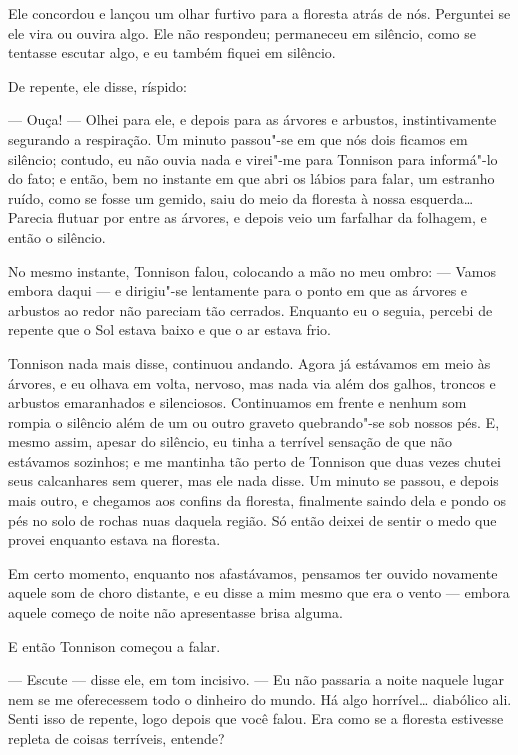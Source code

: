 Ele concordou e lançou um olhar furtivo para a floresta atrás de nós. Perguntei se ele vira ou ouvira algo. Ele não
respondeu; permaneceu em silêncio, como se tentasse escutar algo, e eu também fiquei em silêncio.

De repente, ele disse, ríspido:

--- Ouça! --- Olhei para ele, e depois para as árvores e arbustos, instintivamente segurando a respiração. Um minuto passou"-se
em que nós dois ficamos em silêncio; contudo, eu não ouvia nada e virei"-me para Tonnison para informá"-lo do fato; e
então, bem no instante em que abri os lábios para falar, um estranho ruído, como se fosse um gemido, saiu do meio da
floresta à nossa esquerda\ldots{} Parecia flutuar por entre as árvores, e depois veio um farfalhar da folhagem, e então o
silêncio.

No mesmo instante, Tonnison falou, colocando a mão no meu ombro: --- Vamos embora daqui --- e dirigiu"-se lentamente para o
ponto em que as árvores e arbustos ao redor não pareciam tão cerrados. Enquanto eu o seguia, percebi de repente que o
Sol estava baixo e que o ar estava frio.

Tonnison nada mais disse, continuou andando. Agora já estávamos em meio às árvores, e eu olhava em volta, nervoso, mas
nada via além dos galhos, troncos e arbustos emaranhados e silenciosos. Continuamos em frente e nenhum som rompia o
silêncio além de um ou outro graveto quebrando"-se sob nossos pés. E, mesmo assim, apesar do silêncio, eu tinha a
terrível sensação de que não estávamos sozinhos; e me mantinha tão perto de Tonnison que duas vezes chutei seus
calcanhares sem querer, mas ele nada disse. Um minuto se passou, e depois mais outro, e chegamos aos confins da
floresta, finalmente saindo dela e pondo os pés no solo de rochas nuas daquela região. Só então deixei de sentir o medo
que provei enquanto estava na floresta.

Em certo momento, enquanto nos afastávamos, pensamos ter ouvido novamente aquele som de choro distante, e eu disse a mim
mesmo que era o vento --- embora aquele começo de noite não apresentasse brisa alguma.

E então Tonnison começou a falar.

--- Escute --- disse ele, em tom incisivo. --- Eu não passaria a noite naquele lugar nem se me oferecessem todo o dinheiro do
mundo. Há algo horrível\ldots{} diabólico ali. Senti isso de repente, logo depois que você falou. Era como se a
floresta estivesse repleta de coisas terríveis, entende?

